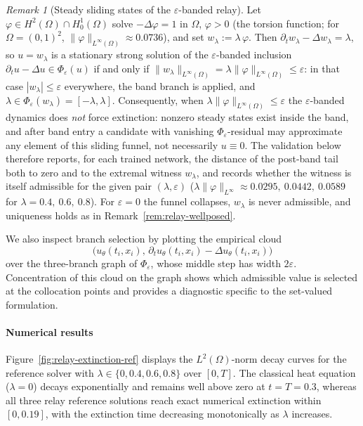 \documentclass[11pt]{elsarticle}
\theoremstyle{definition}
\theoremstyle{remark}
\newtheorem{remark}[theorem]{Remark}
\numberwithin{equation}{section}
\begin{document}
\begin{remark}[Steady sliding states of the $\varepsilon$-banded relay]
	\label{rem:relay-witness}
	Let $\varphi\in H^2(\Omega)\cap H^1_0(\Omega)$ solve
	$-\Delta\varphi=1$ in $\Omega$, $\varphi>0$ (the torsion function;
	for $\Omega=(0,1)^2$,
	$\|\varphi\|_{L^\infty(\Omega)}\approx0.0736$), and set
	$w_\lambda:=\lambda\,\varphi$. Then
	$\partial_t w_\lambda-\Delta w_\lambda=\lambda$, so $u=w_\lambda$ is a
	stationary strong solution of the $\varepsilon$-banded inclusion
	$\partial_t u-\Delta u\in\Phi_\varepsilon(u)$ if and only if
	$\|w_\lambda\|_{L^\infty(\Omega)}
	=\lambda\|\varphi\|_{L^\infty(\Omega)}\le\varepsilon$: in that case
	$|w_\lambda|\le\varepsilon$ everywhere, the band branch is applied, and
	$\lambda\in \Phi_\varepsilon (w_\lambda)= [-\lambda,\lambda]$. Consequently, when
	$\lambda\|\varphi\|_{L^\infty(\Omega)}\le\varepsilon$ the
	$\varepsilon$-banded dynamics does \emph{not} force extinction:
	nonzero steady states exist inside the band, and after band entry a
	candidate with vanishing $\Phi_\varepsilon$-residual may approximate
	any element of this sliding funnel, not necessarily $u\equiv0$. The
	validation below therefore reports, for each trained network, the
	distance of the post-band tail both to zero and to the extremal
	witness $w_\lambda$, and records whether the witness is itself
	admissible for the given pair $(\lambda,\varepsilon)$
	($\lambda\|\varphi\|_{L^\infty}\approx0.0295,\ 0.0442,\ 0.0589$ for
	$\lambda=0.4,\ 0.6,\ 0.8$). For $\varepsilon=0$ the funnel collapses,
	$w_\lambda$ is never admissible, and uniqueness holds as in
	Remark~\ref{rem:relay-wellposed}.
\end{remark}
We also inspect branch selection by plotting the empirical cloud
\[
\bigl(u_\theta(t_i,x_i),\,\partial_t u_\theta(t_i,x_i)-\Delta u_\theta(t_i,x_i)\bigr)
\]
over the three-branch graph of $\Phi_\varepsilon$, whose middle step has
width $2\varepsilon$. Concentration of this cloud on the graph shows which
admissible value is selected at the collocation points and provides a
diagnostic specific to the set-valued formulation.



\paragraph{Numerical results}

Figure~\ref{fig:relay-extinction-ref} displays the $L^2(\Omega)$-norm decay curves
for the reference solver with $\lambda\in\{0,0.4,0.6,0.8\}$ over $[0,T]$.
The classical heat equation ($\lambda=0$) decays exponentially and
remains well above zero at $t=T=0.3$, whereas all three
relay reference solutions reach exact numerical extinction within
$[0,0.19]$, with the extinction time decreasing monotonically as
$\lambda$ increases.
\end{document}
